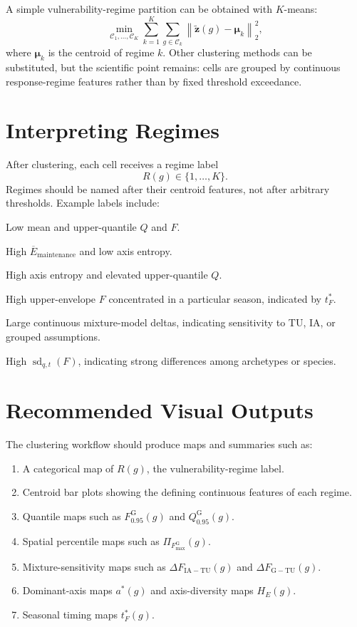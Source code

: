 \documentclass[11pt]{article}
\begin{document}
A simple vulnerability-regime partition can be obtained with $K$-means:
\begin{equation}
\min_{\mathcal{C}_1,\ldots,\mathcal{C}_K}
\sum_{k=1}^{K}\sum_{g\in\mathcal{C}_k}
\left\|\widetilde{\bm{z}}(g)-\bm{\mu}_k\right\|_2^2,
\end{equation}
where $\bm{\mu}_k$ is the centroid of regime $k$. Other clustering methods can be substituted, but the
scientific point remains: cells are grouped by continuous response-regime features rather than by fixed
threshold exceedance.

\section{Interpreting Regimes}
After clustering, each cell receives a regime label
\begin{equation}
R(g)\in\{1,\ldots,K\}.
\end{equation}
Regimes should be named after their centroid features, not after arbitrary thresholds. Example labels include:
\begin{description}[leftmargin=3.6cm]
\item[Low-response regime:] Low mean and upper-quantile $Q$ and $F$.
\item[Maintenance-dominated regime:] High $\overline{E}_{\mathrm{maintenance}}$ and low axis entropy.
\item[Multi-axis impairment regime:] High axis entropy and elevated upper-quantile $Q$.
\item[Pulse-dominated regime:] High upper-envelope $F$ concentrated in a particular season, indicated by $t^*_F$.
\item[Mixture-sensitive regime:] Large continuous mixture-model deltas, indicating sensitivity to TU, IA, or grouped assumptions.
\item[Species-heterogeneous regime:] High $\operatorname{sd}_{q,t}(F)$, indicating strong differences among archetypes or species.
\end{description}

\section{Recommended Visual Outputs}
The clustering workflow should produce maps and summaries such as:
\begin{enumerate}
\item A categorical map of $R(g)$, the vulnerability-regime label.
\item Centroid bar plots showing the defining continuous features of each regime.
\item Quantile maps such as $F_{0.95}^{\mathrm{G}}(g)$ and $Q_{0.95}^{\mathrm{G}}(g)$.
\item Spatial percentile maps such as $\Pi_{F_{\max}^{\mathrm{G}}}(g)$.
\item Mixture-sensitivity maps such as $\Delta F_{\mathrm{IA}-\mathrm{TU}}(g)$ and $\Delta F_{\mathrm{G}-\mathrm{TU}}(g)$.
\item Dominant-axis maps $a^*(g)$ and axis-diversity maps $H_E(g)$.
\item Seasonal timing maps $t^*_F(g)$.
\end{enumerate}
\end{document}
